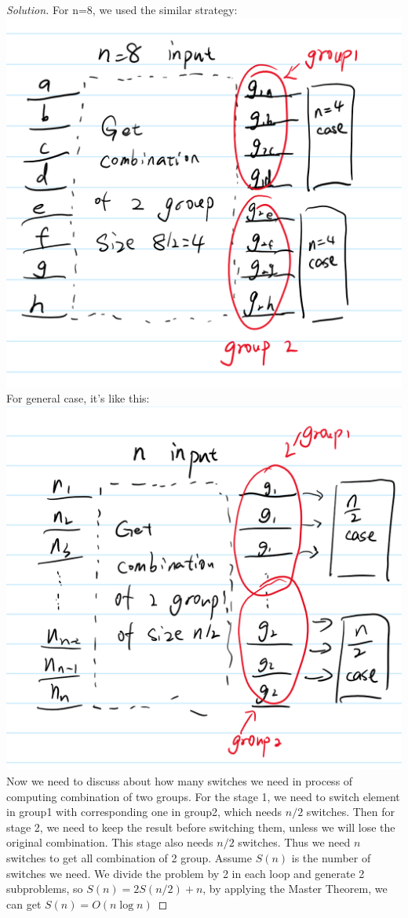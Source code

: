 \documentclass[12pt]{article}
\begin{document}
\begin{proof}[Solution]
	For n=8, we used the similar strategy:\\
	\includegraphics[scale=0.35]{83.png}\\
	For general case, it's like this:\\
	\includegraphics[scale=0.35]{84.png}\\
	Now we need to discuss about how many switches we need in process of computing combination of two groups. For the stage 1, we need to switch element in group1 with corresponding one in group2, which needs $n/2$ switches. Then for stage 2, we need to keep the result before switching them, unless we will lose the original combination. This stage also needs $n/2$ switches. Thus we need $n$ switches to get all combination of 2 group. Assume $S(n)$ is the number of switches we need. We divide the problem by 2 in each loop and generate 2 subproblems, so $S(n)=2S(n/2)+n$, by applying the Master Theorem, we can get $S(n)=O(n\log n)$
	
	
\end{proof}

\bigskip


\begin{thebibliography}{pdf}

\end{thebibliography}
\end{document}
